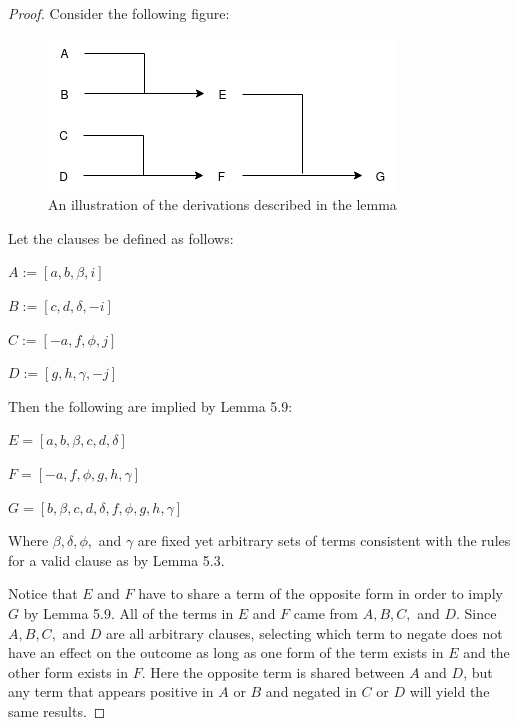 \documentclass[manuscript]{acmart}
\begin{document}
    \begin{proof}
        Consider the following figure:

        \begin{figure}[h]
            \includegraphics[scale=0.8]{517a.png}
            \caption{An illustration of the derivations described in the lemma}
        \end{figure}

        Let the clauses be defined as follows:

        $A := [a, b, \beta, i]$

        $B := [c, d, \delta, -i]$
        
        $C := [-a, f, \phi, j]$
        
        $D := [g, h, \gamma, -j]$

        Then the following are implied by Lemma 5.9:

        $E = [a, b, \beta, c, d, \delta]$
        
        $F = [-a, f, \phi, g, h, \gamma]$
        
        $G = [b, \beta, c, d, \delta, f, \phi, g, h, \gamma]$
        
        Where $\beta, \delta, \phi,$ and $\gamma$ are fixed yet arbitrary sets
        of terms consistent with the rules for a valid clause as by Lemma 5.3.

        Notice that $E$ and $F$ have to share a term of the opposite form
        in order to imply $G$ by Lemma 5.9. All of the terms in $E$ and $F$
        came from $A, B, C,$ and $D$.
        Since $A, B, C,$ and $D$ are
        all arbitrary clauses, selecting which term to negate does not
        have an effect on the outcome as long as one form of the term exists in $E$
        and the other form exists in $F$.
        Here the opposite term is shared 
        between $A$ and $D$, but any term that appears positive in $A$
        or $B$ and negated in $C$ or $D$ will yield the same results.
 

\end{proof}
\end{document}
